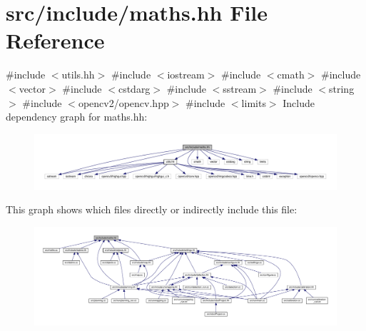 \hypertarget{maths_8hh}{}\section{src/include/maths.hh File Reference}
\label{maths_8hh}
{\ttfamily \#include $<$utils.\+hh$>$}\newline
{\ttfamily \#include $<$iostream$>$}\newline
{\ttfamily \#include $<$cmath$>$}\newline
{\ttfamily \#include $<$vector$>$}\newline
{\ttfamily \#include $<$cstdarg$>$}\newline
{\ttfamily \#include $<$sstream$>$}\newline
{\ttfamily \#include $<$string$>$}\newline
{\ttfamily \#include $<$opencv2/opencv.\+hpp$>$}\newline
{\ttfamily \#include $<$limits$>$}\newline
Include dependency graph for maths.\+hh\+:
\nopagebreak
\begin{figure}[H]
\begin{center}
\leavevmode
\includegraphics[width=350pt]{maths_8hh__incl}
\end{center}
\end{figure}
This graph shows which files directly or indirectly include this file\+:
\nopagebreak
\begin{figure}[H]
\begin{center}
\leavevmode
\includegraphics[width=350pt]{maths_8hh__dep__incl}
\end{center}
\end{figure}
